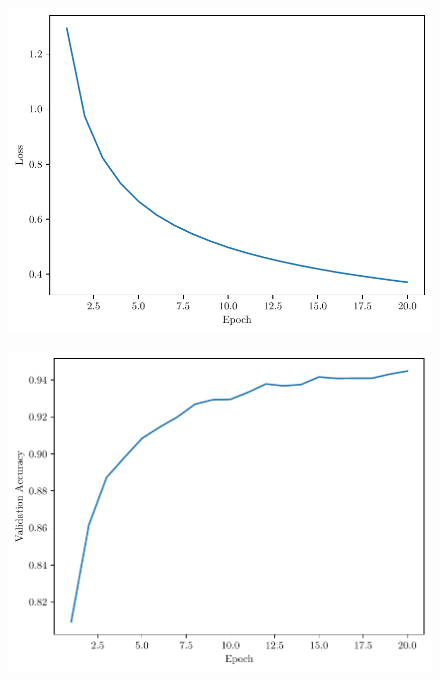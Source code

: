 \begin{questions}
        \begin{figure}[H]
            \centering
            \includegraphics[scale = 0.75]{feedforward-training-loss-0.01-100-2-0.3-relu-sgd-16.pdf}
        \end{figure}
    
        \begin{figure}[H]
            \centering
            \includegraphics[scale = 0.75]{feedforward-validation-accuracy-0.01-100-2-0.3-relu-sgd-16.pdf}
        \end{figure}

    \end{questions}

    \newpage

